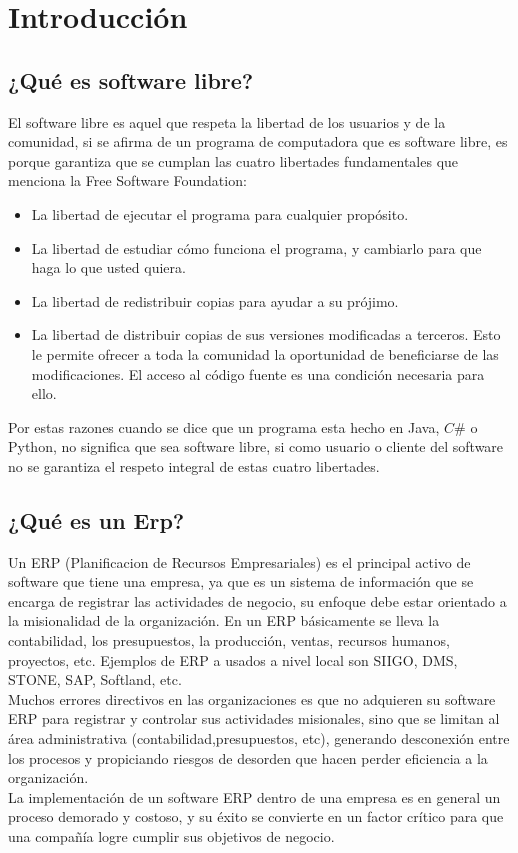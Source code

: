\section{Introducción}
\subsection{¿Qué es software libre?}
El software libre es aquel que respeta la libertad de los usuarios y de la comunidad, si se afirma de un programa de computadora que es software libre, es porque 
garantiza que se cumplan las cuatro libertades fundamentales que menciona la Free Software Foundation\cite{GNU}:
\begin{itemize}
 \item La libertad de ejecutar el programa para cualquier propósito.
 \item La libertad de estudiar cómo funciona el programa, y cambiarlo para que haga lo que usted quiera. 
 \item La libertad de redistribuir copias para ayudar a su prójimo.
 \item La libertad de distribuir copias de sus versiones modificadas a terceros. Esto le permite ofrecer a toda la comunidad la oportunidad de 
 beneficiarse de las modificaciones. El acceso al código fuente es una condición necesaria para ello. 
\end{itemize}
Por estas razones cuando se dice que un programa esta hecho en Java, $C\#$ o Python, no significa que sea software libre, si como usuario o cliente del software no
se garantiza el respeto integral de estas cuatro libertades. 
\subsection{¿Qué es un Erp?}
Un ERP (Planificacion de Recursos Empresariales) es el principal activo de software que tiene una empresa, ya que es un sistema de información que se encarga
de registrar las actividades de negocio, su enfoque debe estar orientado a la misionalidad de la organización. En un ERP básicamente se lleva  
la contabilidad, los presupuestos, la producción, ventas, recursos humanos, proyectos, etc. Ejemplos de ERP a usados a nivel local son SIIGO, DMS, STONE, SAP, Softland, etc.\\
Muchos errores directivos en las organizaciones es que no adquieren su software ERP para registrar y controlar sus actividades misionales, sino que se limitan al área 
administrativa (contabilidad,presupuestos, etc), generando desconexión entre los procesos y propiciando riesgos de desorden que hacen perder eficiencia a la organización.\\
La implementación de un software ERP dentro de una empresa es en general un proceso demorado y costoso, y su éxito se convierte en un factor crítico para que 
una compañía logre cumplir sus objetivos de negocio. 
